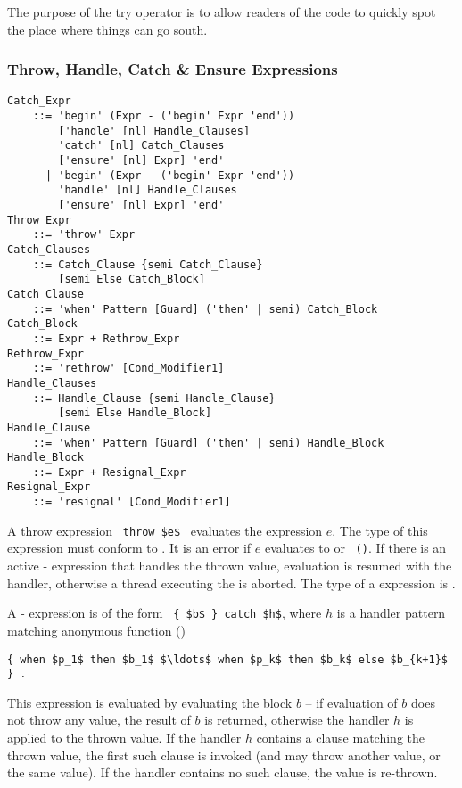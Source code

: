 The purpose of the try operator is to allow readers of the code to quickly spot the place where things can go south.





\subsubsection{Throw, Handle, Catch \& Ensure Expressions}
\label{sec:throw-catch-expressions}

\grammar\begin{lstlisting}
Catch_Expr
    ::= 'begin' (Expr - ('begin' Expr 'end'))
        ['handle' [nl] Handle_Clauses]
        'catch' [nl] Catch_Clauses
        ['ensure' [nl] Expr] 'end'
      | 'begin' (Expr - ('begin' Expr 'end')) 
        'handle' [nl] Handle_Clauses
        ['ensure' [nl] Expr] 'end'
Throw_Expr
    ::= 'throw' Expr
Catch_Clauses 
    ::= Catch_Clause {semi Catch_Clause}
        [semi Else Catch_Block]
Catch_Clause 
    ::= 'when' Pattern [Guard] ('then' | semi) Catch_Block
Catch_Block 
    ::= Expr + Rethrow_Expr
Rethrow_Expr
    ::= 'rethrow' [Cond_Modifier1]
Handle_Clauses 
    ::= Handle_Clause {semi Handle_Clause}
        [semi Else Handle_Block]
Handle_Clause 
    ::= 'when' Pattern [Guard] ('then' | semi) Handle_Block
Handle_Block
    ::= Expr + Resignal_Expr
Resignal_Expr 
    ::= 'resignal' [Cond_Modifier1]
\end{lstlisting}

A throw expression ~\lstinline!throw $e$!~ evaluates the expression $e$. The type of this expression must conform to . It is an error if $e$ evaluates to  or ~\lstinline!()!. If there is an active - expression that handles the thrown value, evaluation is resumed with the handler, otherwise a thread executing the  is aborted. The type of a  expression is . 

A - expression is of the form ~\lstinline!{ $b$ } catch $h$!, where $h$ is a handler pattern matching anonymous function ()
\begin{lstlisting}
{ when $p_1$ then $b_1$ $\ldots$ when $p_k$ then $b_k$ else $b_{k+1}$ } .
\end{lstlisting}

This expression is evaluated by evaluating the block $b$ -- if evaluation of $b$ does not throw any value, the result of $b$ is returned, otherwise the handler $h$ is applied to the thrown value. If the handler $h$ contains a  clause matching the thrown value, the first such clause is invoked (and may throw another value, or the same value). If the handler contains no such clause, the value is re-thrown. 

